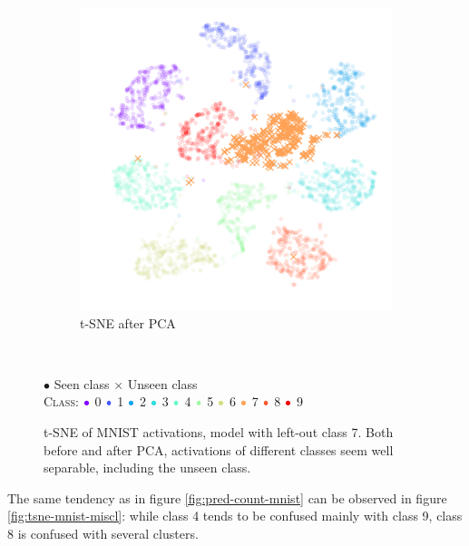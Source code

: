 \documentclass[10pt]{article}
\newcommand{\legendBulletMNIST}{
    \begin{minipage}[t]{0.5\textwidth}
    \centering
    $\bullet$ Seen class $\times$ Unseen class\\
    \textsc{Class}:
    ${\color[rgb]{0.5, 0., 1.}\bullet}$ 0
    ${\color[rgb]{0.28, 0.34, 0.99}\bullet}$ 1
    ${\color[rgb]{0.06, 0.64, 0.94}\bullet}$ 2
    ${\color[rgb]{0.17, 0.87, 0.87}\bullet}$ 3
    ${\color[rgb]{0.39, 0.98, 0.77}\bullet}$ 4
    ${\color[rgb]{0.61, 0.98, 0.64}\bullet}$ 5
    ${\color[rgb]{0.83, 0.87, 0.5 }\bullet}$ 6
    ${\color[rgb]{1.  , 0.64, 0.34}\bullet}$ 7
    ${\color[rgb]{1.  , 0.34, 0.17}\bullet}$ 8
    ${\color[rgb]{1.  , 0.  , 0.  }\bullet}$ 9
    \end{minipage}
    }
\begin{document}
\begin{figure}[H]
\begin{subfigure}{.5\textwidth}
        \includegraphics[width=\textwidth]{MNIST_t-SNE_wo_cl_7_after}
        \caption{\gls{t-SNE} after \gls{PCA}}
    \end{subfigure}
    \\[.2cm]
    \legendBulletMNIST
    \caption{\gls{t-SNE} of MNIST activations, model with left-out class 7. Both before and after \gls{PCA}, activations of different classes seem well separable, including the unseen class.}
    \label{fig:tsne-mnist}
\end{figure}

The same tendency as in figure \ref{fig:pred-count-mnist} can be observed in figure \ref{fig:tsne-mnist-miscl}: while class 4 tends to be confused mainly with class 9, class 8 is confused with several clusters. 
\end{document}
